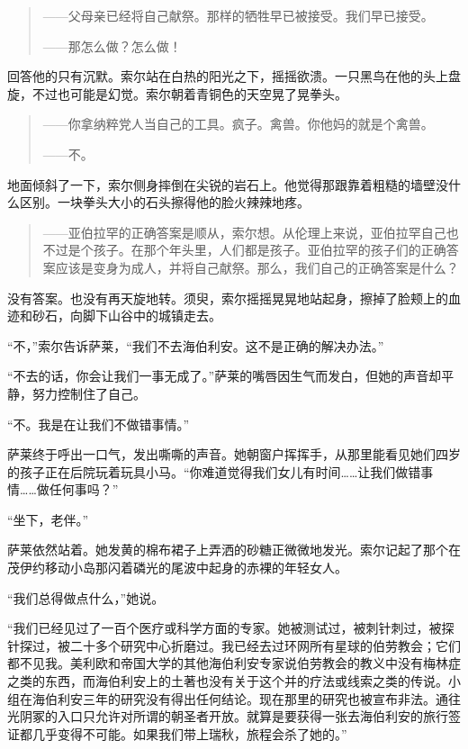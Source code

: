 \documentclass[AutoFakeBold=true]{book}
\begin{document}
\begin{quotation}
	{\kaishu ——父母亲已经将自己献祭。那样的牺牲早已被接受。我们早已接受。}

	——那怎么做？怎么做！
\end{quotation}

回答他的只有沉默。索尔站在白热的阳光之下，摇摇欲溃。一只黑鸟在他的头上盘旋，不过也可能是幻觉。索尔朝着青铜色的天空晃了晃拳头。

\begin{quotation}
	——你拿纳粹党人当自己的工具。疯子。禽兽。你他妈的就是个禽兽。

	——不。
\end{quotation}

地面倾斜了一下，索尔侧身摔倒在尖锐的岩石上。他觉得那跟靠着粗糙的墙壁没什么区别。一块拳头大小的石头擦得他的脸火辣辣地疼。

\begin{quotation}
	——亚伯拉罕的正确答案是顺从，索尔想。从伦理上来说，亚伯拉罕自己也不过是个孩子。在那个年头里，人们都是孩子。亚伯拉罕的孩子们的正确答案应该是变身为成人，并将自己献祭。那么，我们自己的正确答案是什么？
\end{quotation}

没有答案。也没有再天旋地转。须臾，索尔摇摇晃晃地站起身，擦掉了脸颊上的血迹和砂石，向脚下山谷中的城镇走去。

\vspace*{1em}

``不，''索尔告诉萨莱，``我们不去海伯利安。这不是正确的解决办法。''

``不去的话，你会让我们一事无成了。''萨莱的嘴唇因生气而发白，但她的声音却平静，努力控制住了自己。

``不。我是在让我们不做错事情。''

萨莱终于呼出一口气，发出嘶嘶的声音。她朝窗户挥挥手，从那里能看见她们四岁的孩子正在后院玩着玩具小马。``你难道觉得我们女儿有时间……让我们做错事情……做任何事吗？''

``坐下，老伴。''

萨莱依然站着。她发黄的棉布裙子上弄洒的砂糖正微微地发光。索尔记起了那个在茂伊约移动小岛那闪着磷光的尾波中起身的赤裸的年轻女人。

``我们总得做点什么，''她说。

``我们已经见过了一百个医疗或科学方面的专家。她被测试过，被刺针刺过，被探针探过，被二十多个研究中心折磨过。我已经去过环网所有星球的伯劳教会；它们都不见我。美利欧和帝国大学的其他海伯利安专家说伯劳教会的教义中没有梅林症之类的东西，而海伯利安上的土著也没有关于这个并的疗法或线索之类的传说。小组在海伯利安三年的研究没有得出任何结论。现在那里的研究也被宣布非法。通往光阴冢的入口只允许对所谓的朝圣者开放。就算是要获得一张去海伯利安的旅行签证都几乎变得不可能。如果我们带上瑞秋，旅程会杀了她的。''
\end{document}
